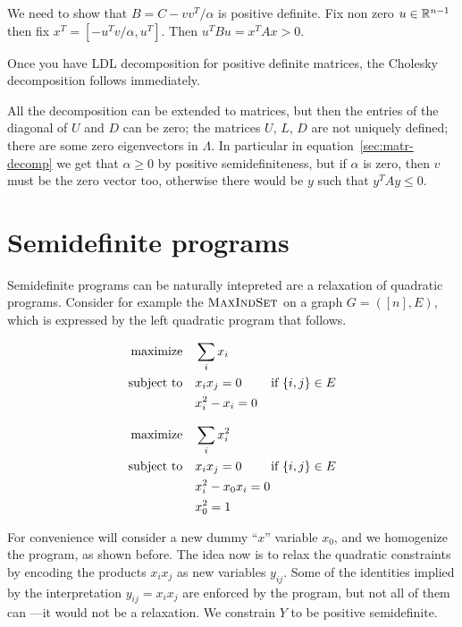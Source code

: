\documentclass[a4paper,twoside,justified]{tufte-handout}
\begin{document}
We need to show that $B = C - vv^{T}/\alpha $ is positive definite. Fix
non zero $ u\in\mathbb{R}^{n-1} $ then fix $ x^{T}=[-u^{T}v/\alpha, u^{T}]
$. Then $ u^{T}Bu = x^{T}Ax > 0$.

Once you have LDL decomposition for positive definite matrices,
the Cholesky decomposition follows immediately.

All the decomposition can be extended to  matrices, but then the entries of the diagonal of $ U
$ and $D$ can be zero; the matrices $ U $, $ L $, $ D $ are not uniquely
defined; there are some zero eigenvectors in $ \Lambda $. In
particular in equation~\eqref{sec:matr-decomp} we get that $ \alpha
\geq 0 $ by positive semidefiniteness, but if $ \alpha $ is zero, then
$ v $ must be the zero vector too, otherwise there would be $ y $ such that
$ y^{T}Ay \leq 0 $.

\section{Semidefinite programs}

Semidefinite programs can be naturally intepreted are a relaxation of
quadratic programs. Consider for example the $
\textsc{MaxIndSet} $ on a graph $ G=([n],E) $, which is
expressed by the left quadratic program that follows.

\begin{figure*}
\begin{minipage}[t]{0.5\textwidth}
\begin{alignat*}{2}\label{eq:maxindset1}
  \maximize \sum_{i}x_{i}\\
  \subjectto x_{i}x_{j} =0 \qquad \text{\ if $\{i,j\}\in E$}\\
  & x^{2}_{i} -x_{i}= 0
\end{alignat*}
\end{minipage}
\begin{minipage}[t]{0.5\textwidth}
\begin{alignat*}{2}
  \text{maximize}\hspace{1em}& \sum_{i}x^{2}_{i}\\
  \text{subject to}\hspace{1em}& x_{i}x_{j} =0 \qquad \text{\ if $\{i,j\}\in E$}\\
  & x^{2}_{i} -x_{0}x_{i} =0\\
  & x^{2}_{0} = 1
\end{alignat*}
\end{minipage}
\end{figure*}


For convenience will consider a new dummy ``$x$'' variable $ x_{0} $,
and we homogenize the program, as shown before. 
%
The idea now is to relax the quadratic constraints by encoding the
products $x_{i}x_{j} $ as new variables $ y_{ij} $. Some of the
identities implied by the interpretation $ y_{ij} = x_{i}x_{j} $ are
enforced by the program, but not all of them can ---it would not be a
relaxation. We constrain $Y$ to be positive semidefinite.
%
\end{document}
